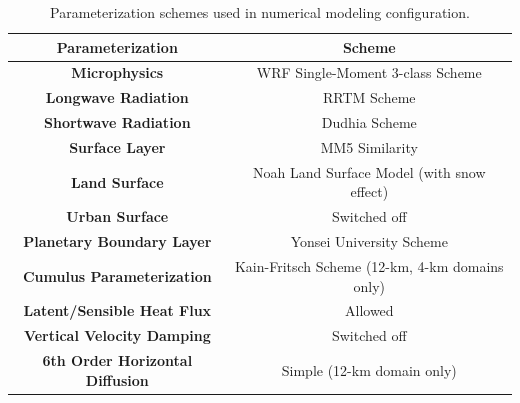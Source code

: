 \documentclass[pdftex,12pt]{article}
\begin{document}
\begin{table}[t]
\caption{Parameterization schemes used in numerical modeling configuration.}
\label{tab:param}
\begin{center}
\begin{tabular}{cc}
\hline \hline
{\textbf{Parameterization}} & {\textbf{Scheme}} \\ \hline
{\textbf{Microphysics}} & WRF Single-Moment 3-class Scheme  \\ 
{\textbf{Longwave Radiation}} & RRTM Scheme  \\ 
{\textbf{Shortwave Radiation}} & Dudhia Scheme \\ 
{\textbf{Surface Layer}} & MM5 Similarity \\ 
{\textbf{Land Surface}} & Noah Land Surface Model (with snow effect) \\ 
{\textbf{Urban Surface}} & Switched off  \\ 
{\textbf{Planetary Boundary Layer}} & Yonsei University Scheme  \\ 
{\textbf{Cumulus Parameterization}} & Kain-Fritsch Scheme (12-km, 4-km domains only)  \\ 
{\textbf{Latent/Sensible Heat Flux}} & Allowed \\ 
{\textbf{Vertical Velocity Damping}} & Switched off  \\ 
{\textbf{6th Order Horizontal Diffusion}} & Simple (12-km domain only) \\ \hline
\end{tabular}
\end{center}
\end{table}
\end{document}
